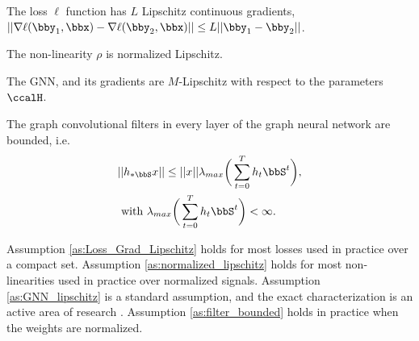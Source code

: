 \documentclass[lettersize,journal]{IEEEtran}
\newcommand{\non}{\rho}
\begin{document}
%
\begin{assumption}\label{as:Loss_Grad_Lipschitz}
	The loss $\ell$ function has $L$ Lipschitz continuous gradients, $||\nabla\ell(\bby_1,\bbx)- \nabla\ell(\bby_2,\bbx)||\leq L||\bby_1-\bby_2||$.
\end{assumption}
\begin{assumption}\label{as:normalized_lipschitz}
	The non-linearity $\non$ is normalized Lipschitz.
\end{assumption}
\begin{assumption}\label{as:GNN_lipschitz}
	The GNN, and its gradients are $M$-Lipschitz with respect to the parameters $\ccalH$.
\end{assumption}
\begin{assumption}\label{as:filter_bounded}
	The graph convolutional filters in every layer of the graph neural network are bounded, i.e.
	\begin{align}
		&||h_{*\bbS}x|| \leq ||x|| \lambda_{max} \bigg(\sum_{t=0}^T h_t \bbS^t\bigg),\nonumber\\
  &\text{ with } \lambda_{max} \bigg(\sum_{t=0}^T h_t \bbS^t\bigg)<\infty.
	\end{align}
\end{assumption}
%
Assumption \ref{as:Loss_Grad_Lipschitz} holds for most losses used in practice over a compact set. 
Assumption \ref{as:normalized_lipschitz} holds for most non-linearities used in practice over normalized signals. Assumption \ref{as:GNN_lipschitz} is a standard assumption, and the exact characterization is an active area of research \cite{fazlyab2019efficient}. Assumption \ref{as:filter_bounded} holds in practice when the weights are normalized.
\end{document}
